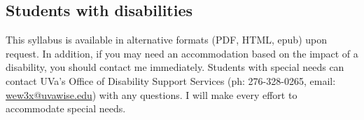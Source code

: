 \documentclass[letterpaper,10pt,english]{sphinxmanual}
\begin{document}
\subsection{Students with disabilities}
\label{syllabus:students-with-disabilities}
This syllabus is available in alternative formats (PDF, HTML, epub) upon
request. In addition, if you may need an accommodation based on the
impact of a disability, you should contact me immediately.
Students with special needs can contact UVa's Office of Disability
Support Services (ph: 276-328-0265, email: \href{mailto:wew3x@uvawise.edu}{wew3x@uvawise.edu}) with any questions.
I will make every effort to accommodate special needs.



\renewcommand{\indexname}{Index}
\printindex
\end{document}
